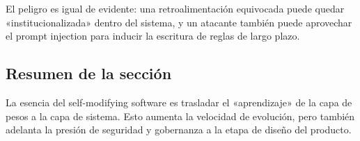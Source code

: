 El peligro es igual de evidente: una retroalimentación equivocada puede quedar «institucionalizada» dentro del sistema, y un atacante también puede aprovechar el prompt injection para inducir la escritura de reglas de largo plazo.

\subsection{Resumen de la sección}
La esencia del self-modifying software es trasladar el «aprendizaje» de la capa de pesos a la capa de sistema. Esto aumenta la velocidad de evolución, pero también adelanta la presión de seguridad y gobernanza a la etapa de diseño del producto.

